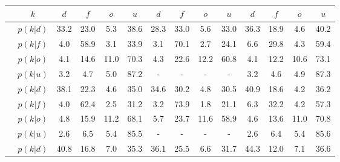 \begin{center}
\begin{tabular}{c|c|cccc|cccc|cccc}
	&$k$ & $d$ & $f$ & $o$ & $u$ & $d$ & $f$ & $o$ & $u$ & $d$ & $f$ & $o$ & $u$\\
	\hline
	\parbox[t]{2mm}{}&$p(k|d)$ & \textcolor{mygreen}{33.2} & \textcolor{myred}{23.0} & \textcolor{myred}{5.3} & 38.6 & \textcolor{mygreen}{28.3} & \textcolor{myred}{33.0} & \textcolor{myred}{5.6} & 33.0 & \textcolor{mygreen}{36.3} & \textcolor{myred}{18.9} & \textcolor{myred}{4.6} & 40.2\\
	&$p(k|f)$ & \textcolor{myred}{4.0} & \textcolor{mygreen}{58.9} & \textcolor{myred}{3.1} & 33.9 & \textcolor{myred}{3.1} & \textcolor{mygreen}{70.1} & \textcolor{myred}{2.7} & 24.1 & \textcolor{myred}{6.6} & \textcolor{mygreen}{29.8} & \textcolor{myred}{4.3} & 59.4\\
	&$p(k|o)$ & \textcolor{myred}{4.1} & \textcolor{myred}{14.6} & \textcolor{mygreen}{11.0} & 70.3 & \textcolor{myred}{4.3} & \textcolor{myred}{22.6} & \textcolor{mygreen}{12.2} & 60.8 & \textcolor{myred}{4.1} & \textcolor{myred}{12.2} & \textcolor{mygreen}{10.6} & 73.1\\
	&$p(k|u)$ & 3.2 & 4.7 & 5.0 & 87.2 & - & - & - & - & 3.2 & 4.6 & 4.9 & 87.3\\
	\hline
	\parbox[t]{2mm}{}&$p(k|d)$ & \textcolor{mygreen}{38.1} & \textcolor{myred}{22.3} & \textcolor{myred}{4.6} & 35.0 & \textcolor{mygreen}{34.6} & \textcolor{myred}{30.2} & \textcolor{myred}{4.8} & 30.5 & \textcolor{mygreen}{40.9} & \textcolor{myred}{18.6} & \textcolor{myred}{4.2} & 36.2\\
	&$p(k|f)$ & \textcolor{myred}{4.0} & \textcolor{mygreen}{62.4} & \textcolor{myred}{2.5} & 31.2 & \textcolor{myred}{3.2} & \textcolor{mygreen}{73.9} & \textcolor{myred}{1.8} & 21.1 & \textcolor{myred}{6.3} & \textcolor{mygreen}{32.2} & \textcolor{myred}{4.2} & 57.3\\
	&$p(k|o)$ & \textcolor{myred}{4.8} & \textcolor{myred}{15.9} & \textcolor{mygreen}{11.2} & 68.1 & \textcolor{myred}{5.7} & \textcolor{myred}{23.7} & \textcolor{mygreen}{11.6} & 58.9 & \textcolor{myred}{4.6} & \textcolor{myred}{13.6} & \textcolor{mygreen}{11.0} & 70.8\\
	&$p(k|u)$ & 2.6 & 6.5 & 5.4 & 85.5 & - & - & - & - & 2.6 & 6.4 & 5.4 & 85.6\\
	\hline
	\parbox[t]{2mm}{}&$p(k|d)$ & \textcolor{mygreen}{40.8} & \textcolor{myred}{16.8} & \textcolor{myred}{7.0} & 35.3 & \textcolor{mygreen}{36.1} & \textcolor{myred}{25.5} & \textcolor{myred}{6.6} & 31.7 & \textcolor{mygreen}{44.3} & \textcolor{myred}{12.0} & \textcolor{myred}{7.1} & 36.6\\

\end{tabular}
\end{center}
